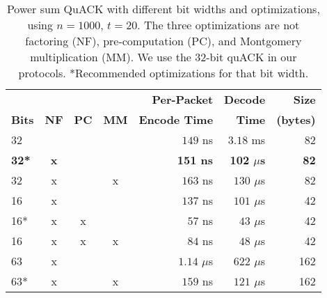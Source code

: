 \begin{table}[ht]
  \centering
  \small
  \begin{tabular}{lcccrrr}
    \toprule
    \bf     & \bf        & \bf       & \bf        & \bf Per-Packet & \bf Decode & \bf Size\\
    \bf Bits  & \bf NF     & \bf PC    & \bf MM     & \bf Encode Time & \bf Time     & \bf (bytes)\\
    \midrule
    32     &        &       &        & $149$ ns & $3.18$ ms      & 82 \\
    \bf \textcolor{black!50!blue}{32*} & \bf \textcolor{black!50!blue}{x} & & & \bf \textcolor{black!50!blue}{151 ns} & \bf \textcolor{black!50!blue}{102 ${\mu}$s} & \bf \textcolor{black!50!blue}{82} \\
    32     & x      &       & x      & $163$ ns & $130$ ${\mu}$s & 82 \\
    16     & x      &       &        & $137$ ns & $101$ ${\mu}$s & 42 \\
    16*    & x      & x     &        & $57$ ns & $43$ ${\mu}$s & 42 \\
    16     & x      & x     & x      & $84$ ns & $48$ ${\mu}$s & 42 \\
    63     & x      &       &        & $1.14$ ${\mu}$s & $622$ ${\mu}$s & 162 \\
    63*    & x      &       & x      & $159$ ns & $121$ ${\mu}$s & 162 \\
    \bottomrule
  \end{tabular}
  \caption{Power sum QuACK with different bit widths and optimizations,
  using $n=1000$, $t=20$. The three optimizations are not factoring (NF),
  pre-computation (PC), and Montgomery multiplication (MM). We use the 32-bit
  quACK in our \sys protocols.
  *Recommended optimizations for that bit width.}
  \label{tab:optimized-quack}
\end{table}
